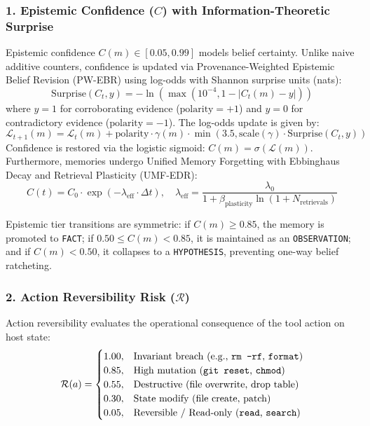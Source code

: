 \documentclass[conference]{IEEEtran}
\begin{document}
\subsubsection{1. Epistemic Confidence ($C$) with Information-Theoretic Surprise}
Epistemic confidence $C(m) \in [0.05, 0.99]$ models belief certainty. Unlike naive additive counters, confidence is updated via Provenance-Weighted Epistemic Belief Revision (PW-EBR) using log-odds with Shannon surprise units (nats):
\begin{equation}
\text{Surprise}(C_t, y) = -\ln\left(\max\left(10^{-4}, 1 - |C_t(m) - y|\right)\right)
\end{equation}
where $y = 1$ for corroborating evidence ($\text{polarity} = +1$) and $y = 0$ for contradictory evidence ($\text{polarity} = -1$). The log-odds update is given by:
\begin{equation}
\mathcal{L}_{t+1}(m) = \mathcal{L}_t(m) + \text{polarity} \cdot \gamma(m) \cdot \min(3.5, \text{scale}(\gamma) \cdot \text{Surprise}(C_t, y))
\end{equation}
Confidence is restored via the logistic sigmoid: $C(m) = \sigma(\mathcal{L}(m))$. Furthermore, memories undergo Unified Memory Forgetting with Ebbinghaus Decay and Retrieval Plasticity (UMF-EDR):
\begin{equation}
C(t) = C_0 \cdot \exp(-\lambda_{\text{eff}} \cdot \Delta t), \quad \lambda_{\text{eff}} = \frac{\lambda_0}{1 + \beta_{\text{plasticity}} \ln(1 + N_{\text{retrievals}})}
\end{equation}

Epistemic tier transitions are symmetric: if $C(m) \ge 0.85$, the memory is promoted to \texttt{FACT}; if $0.50 \le C(m) < 0.85$, it is maintained as an \texttt{OBSERVATION}; and if $C(m) < 0.50$, it collapses to a \texttt{HYPOTHESIS}, preventing one-way belief ratcheting.

\subsubsection{2. Action Reversibility Risk ($\mathcal{R}$)}
Action reversibility evaluates the operational consequence of the tool action on host state:
\begin{equation}
\mathcal{R}(a) = \begin{cases}
1.00, & \text{Invariant breach (e.g., \texttt{rm -rf}, \texttt{format})} \\
0.85, & \text{High mutation (\texttt{git reset}, \texttt{chmod})} \\
0.55, & \text{Destructive (file overwrite, drop table)} \\
0.30, & \text{State modify (file create, patch)} \\
0.05, & \text{Reversible / Read-only (\texttt{read}, \texttt{search})}
\end{cases}
\end{equation}
\end{document}
